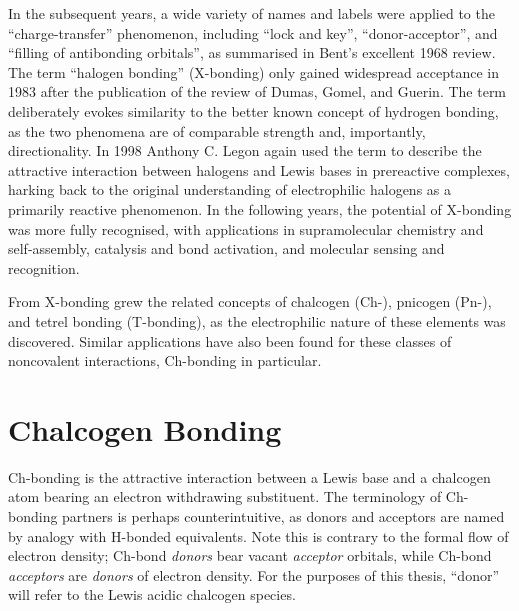 \begin{refsection}
In the subsequent years, a wide variety of names and labels were applied to the ``charge-transfer'' phenomenon, including ``lock and key'', ``donor-acceptor'', and ``filling of antibonding orbitals'', as summarised in Bent's excellent 1968 review\autocite{Bent1968}.
The term ``halogen bonding'' (X-bonding) only gained widespread acceptance in 1983 after the publication of the review of Dumas, Gomel, and Guerin.\autocite{Dumas1983}
The term deliberately evokes similarity to the better known concept of hydrogen bonding, as the two phenomena are of comparable strength and, importantly, directionality.
In 1998 Anthony C. Legon again used the term to describe the attractive interaction between halogens and Lewis bases in prereactive complexes, harking back to the original understanding of electrophilic halogens as a primarily reactive phenomenon.\autocite{Legon1998,Legon1999}
In the following years, the potential of X-bonding was more fully recognised, with applications in supramolecular chemistry and self-assembly\autocite{Corradi2000,Metrangolo2008,Priimagi2013}, catalysis and bond activation\autocite{Walter2011,Soloshonok2017,Takagi2017}, and molecular sensing and recognition\autocite{Cornes2017,VargasJentzsch2013,Borissov2017}.

From X-bonding grew the related concepts of chalcogen (Ch-), pnicogen (Pn-), and tetrel bonding (T-bonding), as the electrophilic nature of these elements was discovered.\autocite{Murray2007}
Similar applications have also been found for these classes of noncovalent interactions, Ch-bonding in particular.\autocite{Fanfrlik2014,Garrett2016,Ho2016,Wonner2017,Mitchell2017,Benz2017,Biot2018,Ho2017}

\section{Chalcogen Bonding}
Ch-bonding is the attractive interaction between a Lewis base and a chalcogen atom bearing an electron withdrawing substituent.
The terminology of Ch-bonding partners is perhaps counterintuitive, as donors and acceptors are named by analogy with H-bonded equivalents.
Note this is contrary to the formal flow of electron density; Ch-bond \emph{donors} bear vacant \emph{acceptor} orbitals, while Ch-bond \emph{acceptors} are \emph{donors} of electron density.
For the purposes of this thesis, ``donor'' will refer to the Lewis acidic chalcogen species.


\end{refsection}

